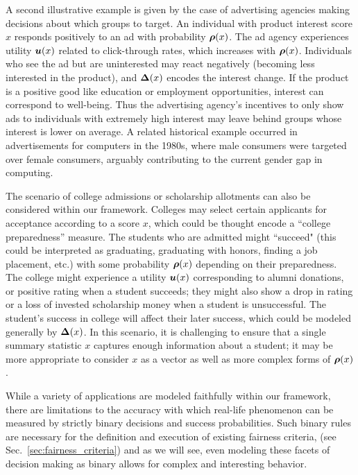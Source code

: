 \begin{exmp}[Advertising]
	\label{ex:advertizing}
	A second illustrative example is given by the case of advertising agencies making decisions about which groups to target. An individual with product interest score $x$ responds positively to an ad with probability $\boldsymbol{\rho}(x)$. The ad agency experiences utility $\boldsymbol{u}(x)$ related to click-through rates, which increases with $\boldsymbol{\rho}(x)$. Individuals who see the ad but are uninterested may react negatively (becoming less interested in the product), and $\boldsymbol{\Delta}(x)$ encodes the interest change. 
	If the product is a  positive good like education or employment opportunities, interest can correspond to well-being.
	Thus the advertising agency's incentives to only show ads to individuals with extremely high interest may leave behind groups whose interest is lower on average. 
	A related historical example occurred in advertisements for computers in the 1980s, where male consumers were targeted over female consumers, arguably contributing to the current gender gap in computing. %
\end{exmp}

\begin{exmp}
	\label{ex:admissions}
	
	The scenario of college admissions or scholarship allotments can also be considered within our framework. Colleges may select certain applicants for acceptance according to a score $x$, which could be thought encode a ``college preparedness'' measure. The students who are admitted might ``succeed" (this could be interpreted as graduating, graduating with honors, finding a job placement, etc.) with some probability $\boldsymbol{\rho}(x)$ depending on their preparedness. The college might experience a utility $\boldsymbol{u}(x)$ corresponding to alumni donations, or positive rating when a student succeeds; they might also show a drop in rating or a loss of invested scholarship money when a student is unsuccessful. The student's success in college will affect their later success, which could be modeled generally by $\boldsymbol{\Delta}(x)$. In this scenario, it is challenging to ensure that a single summary statistic $x$ captures enough information about a student; it may be more appropriate to consider $x$ as a vector as well as more complex forms of $\boldsymbol{\rho}(x)$. 
\end{exmp}

While a variety of applications are modeled faithfully within our framework, there are limitations to the accuracy with which real-life phenomenon can be measured by strictly binary decisions and success probabilities. Such binary rules are necessary for the definition and execution of existing fairness criteria, (see Sec.~\ref{sec:fairness_criteria}) and as we will see, even modeling these facets of decision making as binary allows for complex and interesting behavior.


